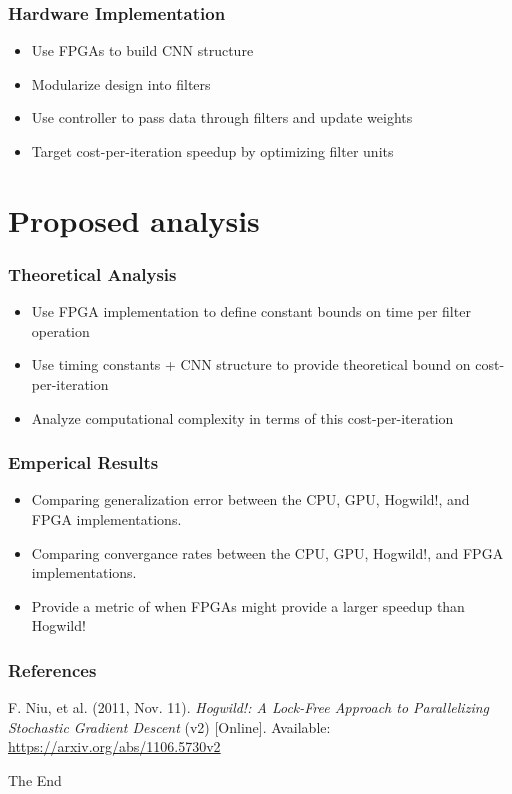 \documentclass{beamer}
\begin{document}
\begin{frame}
	\frametitle{Hardware Implementation}
	\begin{itemize}
		\item Use FPGAs to build CNN structure
		\item Modularize design into filters
		\item Use controller to pass data through filters and update weights
		\item Target cost-per-iteration speedup by optimizing filter units
	\end{itemize}
\end{frame}

\section{Proposed analysis}
\begin{frame}
	\frametitle{Theoretical Analysis}
	\begin{itemize}
		\item Use FPGA implementation to define constant bounds on time per filter operation
		\item Use timing constants + CNN structure to provide theoretical bound on cost-per-iteration
		\item Analyze computational complexity in terms of this cost-per-iteration
	\end{itemize}
\end{frame}

\begin{frame}
	\frametitle{Emperical Results}
	\begin{itemize}
		\item Comparing generalization error between the CPU, GPU, Hogwild!, and FPGA implementations.
		\item Comparing convergance rates between the CPU, GPU, Hogwild!, and FPGA implementations.
		\item Provide a metric of when FPGAs might provide a larger speedup than Hogwild!
	\end{itemize}
\end{frame}


\begin{frame}
	\frametitle{References}
	\footnotesize{
		\begin{thebibliography}{9} %
			F. Niu, et al. (2011, Nov. 11).
			\emph{Hogwild!: A Lock-Free Approach to Parallelizing Stochastic Gradient Descent} (v2) [Online].
			Available: \url{https://arxiv.org/abs/1106.5730v2}
		\end{thebibliography}
	}
\end{frame}


\begin{frame}
	\Huge{\centerline{The End}}
\end{frame}
\end{document}
